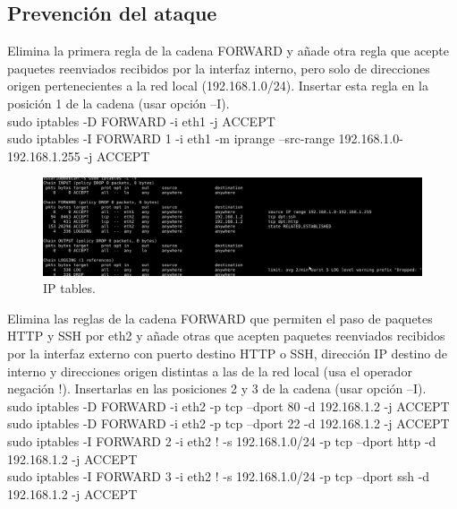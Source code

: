 \documentclass[11pt]{article}
\begin{document}
    \subsection{Prevención del ataque}
      \par
      Elimina la primera regla de la cadena FORWARD y añade otra regla que
      acepte paquetes reenviados recibidos por la interfaz interno, pero solo de
      direcciones origen pertenecientes a la red local (192.168.1.0/24).
      Insertar esta regla en la posición 1 de la cadena (usar opción –I).\\
      \vspace{2mm}
      sudo iptables -D FORWARD -i eth1 -j ACCEPT\\
      sudo iptables -I FORWARD 1 -i eth1 -m iprange --src-range
        192.168.1.0-192.168.1.255  -j ACCEPT

      \begin{figure}[H]
        \centering
        \includegraphics[width = \textwidth]{iptables2}
        \caption{IP tables.}
      \end{figure}

      \bigskip
      \par
      Elimina las reglas de la cadena FORWARD que permiten el paso de paquetes
      HTTP y SSH por eth2 y añade otras que acepten paquetes reenviados
      recibidos por la interfaz externo con puerto destino HTTP o SSH, dirección
      IP destino de interno y direcciones origen distintas a las de la red local
      (usa el operador negación !). Insertarlas en las posiciones 2 y 3 de la
      cadena (usar opción –I).\\
      \vspace{2mm}
      sudo iptables -D FORWARD -i eth2 -p tcp --dport 80 -d 192.168.1.2 -j
        ACCEPT\\
      sudo iptables -D FORWARD -i eth2 -p tcp --dport 22 -d 192.168.1.2 -j
        ACCEPT\\
      sudo iptables -I FORWARD 2 -i eth2 ! -s  192.168.1.0/24 -p tcp --dport
        http -d 192.168.1.2 -j ACCEPT\\
      sudo iptables -I FORWARD 3 -i eth2 ! -s  192.168.1.0/24 -p tcp --dport ssh
        -d 192.168.1.2 -j ACCEPT
\end{document}
